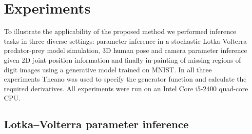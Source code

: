 \section{Experiments}\label{sec:dgm-experiments}

To illustrate the applicability of the proposed method we performed inference tasks in three diverse settings: parameter inference in a stochastic Lotka-Volterra predator-prey model simulation, 3D human pose and camera parameter inference given 2D joint position information and finally in-painting of missing regions of digit images using a generative model trained on MNIST. In all three experiments Theano \citep{theano2016theano} was used to specify the generator function and calculate the required derivatives. All experiments were run on an Intel Core i5-2400 quad-core CPU. %

\subsection{Lotka--Volterra parameter inference}


